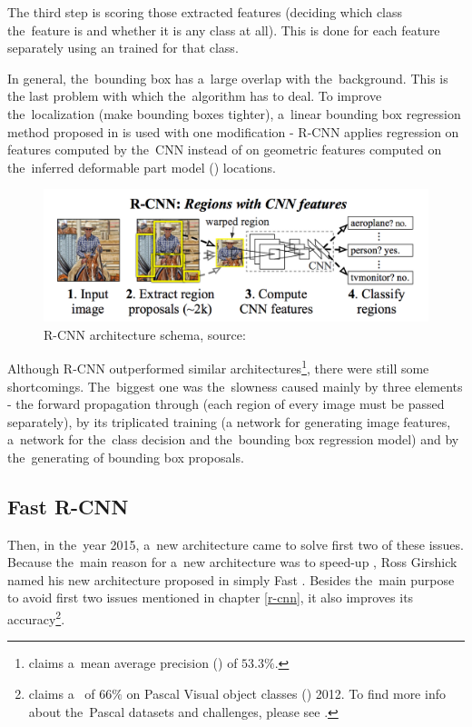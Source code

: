 The third step is scoring those extracted features (deciding which class
the~feature is and whether it is any class at all). This is done for each feature 
separately using an  trained for that class.

In general, the~bounding box has a~large overlap with the~background. This is 
the last problem with which the~algorithm has to deal. To improve
the~localization (make bounding boxes tighter), a~linear bounding box regression 
method proposed in \cite{object-det} is used with one modification - R-CNN 
applies regression on features computed by the~CNN instead of on geometric 
features computed on the~inferred deformable part model () locations.

\begin{figure}[H]
   \centering
	\includegraphics[width=.9\linewidth]{./pictures/rcnn.png}
	\caption[R-CNN architecture]{R-CNN architecture schema, source: \cite{rcnn}}
      \label{fig:rcnn}
\end{figure}

Although R-CNN outperformed similar architectures\footnote{\cite{rcnn} claims
a~mean average precision () of $53.3 \%$.}, there were still some 
shortcomings. The~biggest one was the~slowness caused mainly by three elements - 
the forward propagation through  (each region of every image must be 
passed separately), by its triplicated training (a network for generating image 
features, a~network for the~class decision and the~bounding box regression 
model) and by the~generating of bounding box proposals.

\subsection{Fast R-CNN}
\label{fast-rcnn}

Then, in the~year 2015, a~new architecture came to solve first two of these issues. 
Because the~main reason for a~new architecture was to speed-up , Ross 
Girshick named his new architecture proposed in \cite{fast-rcnn} simply Fast 
. Besides the~main purpose to avoid first two issues mentioned in 
chapter \ref{r-cnn}, it also improves its accuracy\footnote{\cite{fast-rcnn} 
claims a~ of $66 \%$ on Pascal Visual object classes () 2012. To 
find more info about the~Pascal  datasets and challenges, please see 
\cite{voc}.}.

